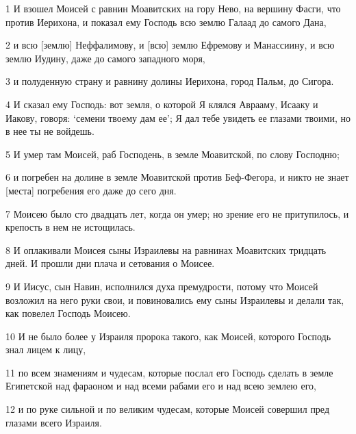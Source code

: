 \par 1 И взошел Моисей с равнин Моавитских на гору Нево, на вершину Фасги, что против Иерихона, и показал ему Господь всю землю Галаад до самого Дана,
\par 2 и всю [землю] Неффалимову, и [всю] землю Ефремову и Манассиину, и всю землю Иудину, даже до самого западного моря,
\par 3 и полуденную страну и равнину долины Иерихона, город Пальм, до Сигора.
\par 4 И сказал ему Господь: вот земля, о которой Я клялся Аврааму, Исааку и Иакову, говоря: `семени твоему дам ее'; Я дал тебе увидеть ее глазами твоими, но в нее ты не войдешь.
\par 5 И умер там Моисей, раб Господень, в земле Моавитской, по слову Господню;
\par 6 и погребен на долине в земле Моавитской против Беф-Фегора, и никто не знает [места] погребения его даже до сего дня.
\par 7 Моисею было сто двадцать лет, когда он умер; но зрение его не притупилось, и крепость в нем не истощилась.
\par 8 И оплакивали Моисея сыны Израилевы на равнинах Моавитских тридцать дней. И прошли дни плача и сетования о Моисее.
\par 9 И Иисус, сын Навин, исполнился духа премудрости, потому что Моисей возложил на него руки свои, и повиновались ему сыны Израилевы и делали так, как повелел Господь Моисею.
\par 10 И не было более у Израиля пророка такого, как Моисей, которого Господь знал лицем к лицу,
\par 11 по всем знамениям и чудесам, которые послал его Господь сделать в земле Египетской над фараоном и над всеми рабами его и над всею землею его,
\par 12 и по руке сильной и по великим чудесам, которые Моисей совершил пред глазами всего Израиля.


